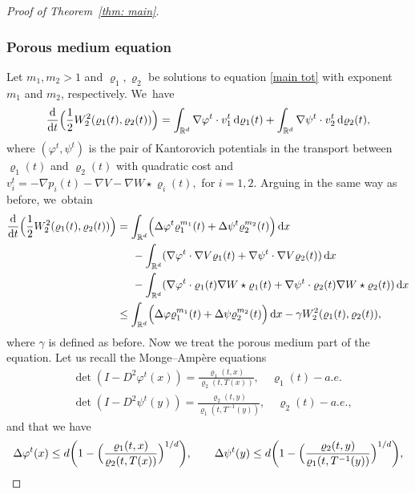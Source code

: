 \documentclass[10pt]{amsart}
\newcommand{\Bprt}[1]{\Bigl(#1\Bigr)}
\newcommand{\bbprt}[1]{\biggl(#1\biggr)}
\newcommand{\dx}[1]{\mathop{}\!\mathrm{d} #1}
\newcommand{\ddt}{\frac{\dx{}}{\dx{t}}}
\newcommand{\R}{\mathbb{R}}
\theoremstyle{plain}
\theoremstyle{remark}
\begin{document}
\begin{proof}[Proof of Theorem~\ref{thm: main}]
\subsubsection*{Porous medium equation}
Let $m_1, m_2>1$ and $\varrho_1, \varrho_2$ be solutions to equation \eqref{main tot} with exponent $m_1$ and $m_2$, respectively. We~have\vspace*{-3pt}
\begin{equation*}
\ddt \Bprt{\frac 12 W_2^2(\varrho_1(t), \varrho_2(t))} = \int_{\R^d} \nabla \varphi^t \cdot v_1^t \dx{\varrho_1(t)} + \int_{\R^d} \nabla \psi^t \cdot v^t_2 \dx{\varrho_2(t)},
\end{equation*}
where $(\varphi^t, \psi^t)$ is the pair of Kantorovich potentials in the transport between $\varrho_1(t)$ and $\varrho_2(t)$ with quadratic cost and $v_i^t = -\nabla p_i(t) - \nabla V - \nabla W \star \varrho_i(t),$ for $i=1,2$.
Arguing in the same way as before, we~obtain\vspace*{-5pt}
\begin{align*}\label{dt W2 pme}
\ddt \Bprt{\frac 12 W_2^2(\varrho_1(t), \varrho_2(t))} &= \int_{\R^d} \Bprt{\Delta \varphi^t \varrho_1^{m_1}(t) +\Delta \psi^t \varrho_2^{m_2}(t) }\dx x\\
&\hspace*{.5cm} - \int_{\R^d} (\nabla \varphi^t \cdot \nabla V \varrho_1(t) + \nabla \psi^t \cdot \nabla V \varrho_2(t)) \dx x\\
&\hspace*{.5cm} - \int_{\R^d} (\nabla \varphi^t \cdot \varrho_1(t)\nabla W\star \varrho_1(t) +\nabla \psi^t \cdot \varrho_2(t)\nabla W\star \varrho_2(t) ) \dx x\\
&\leq \int_{\R^d} \Bprt{\Delta \varphi \varrho_1^{m_1}(t) +\Delta \psi \varrho_2^{m_2}(t) }\dx x -\gamma W_2^2(\varrho_1(t),\varrho_2(t)),
\end{align*}
where $\gamma$ is defined as before.
Now we treat the porous medium part of the equation.
Let us recall the Monge--Ampère equations\vspace*{-3pt}
\begin{align*}
&\det (I - D^2 \varphi^t(x)) = \frac{\varrho_1(t,x)}{\varrho_2(t,T (x))}, \quad \varrho_1(t)-a.e. \\[-3pt]
&\det (I - D^2 \psi^t(y)) = \frac{\varrho_2(t,y)}{\varrho_1(t,T^{-1}(y))}, \quad \varrho_2(t)-a.e.,
\end{align*}
and that we have
\[
\Delta \varphi^t(x)\leq d\bbprt{1-\Bprt{\frac{\varrho_1(t,x)}{\varrho_2(t,T(x))}}^{1/d}}, \qquad\Delta \psi^t(y)\leq d\bbprt{1-\Bprt{\frac{\varrho_2(t,y)}{\varrho_1(t,T^{-1}(y))}}^{1/d}},
\]
\end{proof}
\end{document}
